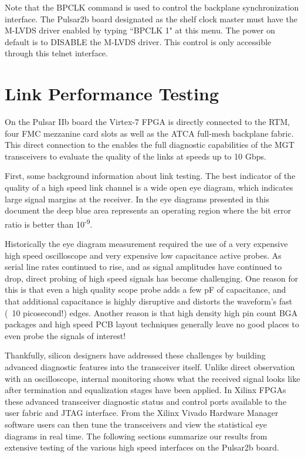 \documentclass[letterpaper]{article}
\begin{document}
Note that the BPCLK command is used to control the backplane synchronization interface.  The Pulsar2b board designated as the shelf clock master must have the M-LVDS driver enabled by typing ``BPCLK 1" at this menu.  The power on default is to DISABLE the M-LVDS driver.  This control is only accessible through this telnet interface.


\section{Link Performance Testing}
\label{link_perf}

On the Pulsar IIb board the Virtex-7 FPGA is directly connected to the RTM, four FMC mezzanine card slots as well as the ATCA full-mesh backplane fabric.  This direct connection to the enables the full diagnostic capabilities of the MGT transceivers to evaluate the quality of the links at speeds up to 10 Gbps.  

First, some background information about link testing.  The best indicator of the quality of a high speed link channel is a wide open eye diagram, which indicates large signal margins at the receiver.  In the eye diagrams presented in this document the deep blue area represents an operating region where the bit error ratio is better than 10\textsuperscript{-9}.

Historically the eye diagram measurement required the use of a very expensive high speed oscilloscope and very expensive low capacitance active probes.  As serial line rates continued to rise, and as signal amplitudes have continued to drop, direct probing of high speed signals has become challenging.  One reason for this is that even a high quality scope probe adds a few pF of capacitance, and that additional capacitance is highly disruptive and distorts the waveform's fast (~10 picosecond!) edges.  Another reason is that high density high pin count BGA packages and high speed PCB layout techniques generally leave no good places to even probe the signals of interest!

Thankfully, silicon designers have addressed these challenges by building advanced diagnostic features into the transceiver itself.  Unlike direct observation with an oscilloscope, internal monitoring shows what the received signal looks like after termination and equalization stages have been applied.  In Xilinx FPGAs these advanced transceiver diagnostic status and control ports available to the user fabric and JTAG interface.  From the Xilinx Vivado Hardware Manager software users can then tune the transceivers and view the statistical eye diagrams in real time.  The following sections summarize our results from extensive testing of the various high speed interfaces on the Pulsar2b board.
\end{document}
